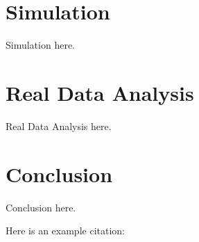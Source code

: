 \documentclass[12pt, letterpaper, titlepage]{article}
\begin{document}
\hypertarget{sec:data}{%
\section{Simulation}\label{sec:data}}

Simulation here.

\hypertarget{sec:methods}{%
\section{Real Data Analysis}\label{sec:methods}}

Real Data Analysis here.

\hypertarget{sec:disc}{%
\section{Conclusion}\label{sec:disc}}

Conclusion here.

Here is an example citation: \citet{Steinskog}



\end{document}

